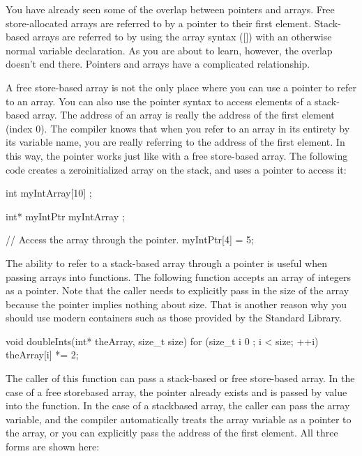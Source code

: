 
You have already seen some of the overlap between pointers and arrays. Free store-allocated arrays are referred to by a pointer to their first element. Stack-based arrays are referred to by using the array syntax ([]) with an otherwise normal variable declaration. As you are about to learn, however, the overlap doesn’t end there. Pointers and arrays have a complicated relationship.


A free store-based array is not the only place where you can use a pointer to refer to an array. You can also use the pointer syntax to access elements of a stack-based array. The address of an array is really the address of the first element (index 0). The compiler knows that when you refer to an array in its entirety by its variable name, you are really referring to the address of the first element. In this way, the pointer works just like with a free store-based array. The following code creates a zeroinitialized array on the stack, and uses a pointer to access it:

\begin{cpp}
int myIntArray[10] {};

int* myIntPtr { myIntArray };

// Access the array through the pointer.
myIntPtr[4] = 5;
\end{cpp}

The ability to refer to a stack-based array through a pointer is useful when passing arrays into functions. The following function accepts an array of integers as a pointer. Note that the caller needs to explicitly pass in the size of the array because the pointer implies nothing about size. That is another reason why you should use modern containers such as those provided by the Standard Library.

\begin{cpp}
void doubleInts(int* theArray, size_t size)
{
    for (size_t i { 0 }; i < size; ++i) { theArray[i] *= 2; }
}
\end{cpp}

The caller of this function can pass a stack-based or free store-based array. In the case of a free storebased array, the pointer already exists and is passed by value into the function. In the case of a stackbased array, the caller can pass the array variable, and the compiler automatically treats the array variable as a pointer to the array, or you can explicitly pass the address of the first element. All three forms are shown here:

